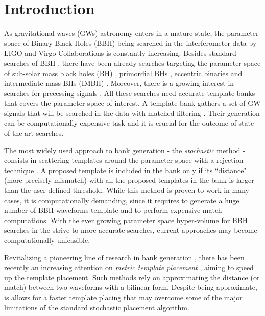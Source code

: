 \documentclass[twocolumn,showpacs,preprintnumbers,nofootinbib,prd,
superscriptaddress,10pt]{revtex4-2}
\begin{document}

\section{Introduction}

As gravitational waves (GWs) astronomy enters in a mature state, the parameter space of Binary Black Holes (BBH) being searched in the interferometer data by LIGO \cite{LIGOScientific:2014pky} and Virgo \cite{VIRGO:2014yos} Collaborations is constantly increasing. Besides standard searches of BBH \cite{GWTC-1,GWTC-2,GWTC-2.1, GWTC-3}, there have been already searches targeting the parameter space of sub-solar mass black holes (BH) \cite{SSM_O2, SSM_O3a, PhysRevD.106.023024}, primordial BHs \cite{PBH}, eccentric binaries \cite{PhysRevD.102.043005, PhysRevD.104.104016, Nitz:2019spj} and intermediate mass BHs (IMBH) \cite{IMBH_O2, IMBH_O3, Chandra:2022ixv}. Moreover, there is a growing interest in searches for precessing signals \cite{PhysRevD.89.024010, PhysRevD.97.023004, PhysRevD.102.041302, Indik:2016qky}.
All these searches need accurate template banks that covers the parameter space of interest. A template bank gathers a set of GW signals that will be searched in the data with matched filtering \cite{Owen:1998dk}. Their generation can be computationally expensive task and it is crucial for the outcome of state-of-the-art searches.

The most widely used approach to bank generation - the {\it stochastic} method \cite{PhysRevD.80.104014, sbank} - consists in scattering templates around the parameter space with a rejection technique \cite{DalCanton:2017ala, Mukherjee:2018yra, Indik:2016qky, Lenon:2021zac}. A proposed template is included in the bank only if its ``distance" (more precisely mismatch) with all the proposed templates in the bank is larger than the user defined threshold.
While this method is proven to work in many cases, it is computationally demanding, since it requires to generate a huge number of BBH waveforms template and to perform expensive match computations.
With the ever growing parameter space hyper-volume for BBH searches in the strive to more accurate searches, current approaches may become computationally unfeasible.

Revitalizing a pioneering line of research in bank generation \cite{owen_metric, Messenger:2008ta}, there has been recently an increasing attention on {\it metric template placement} \cite{Roy:2017oul, 2018cosp...42E2899R, Coogan:2022qxs, Hanna:2022zpk}, aiming to speed up the template placement.
Such methods rely on approximating the distance (or match) between two waveforms with a bilinear form. Despite being approximate, is allows for a faster template placing that may overcome some of the major limitations of the standard stochastic placement algorithm.
\end{document}
